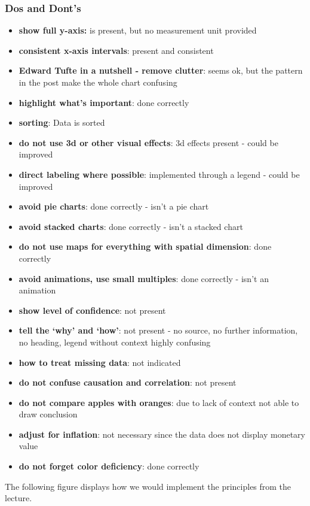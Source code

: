 \documentclass[a4paper]{article}
\begin{document}
    \subsubsection{Dos and Dont's}
    \begin{itemize}
        \item \textbf{show full y-axis:} is present, but no measurement unit provided
        \item \textbf{consistent x-axis intervals}: present and consistent
        \item \textbf{Edward Tufte in a nutshell - remove clutter}: seems ok, but the pattern in the post make the
        whole chart confusing
        \item \textbf{highlight what’s important}: done correctly
        \item \textbf{sorting}: Data is sorted
        \item \textbf{do not use 3d or other visual effects}: 3d effects present - could be improved
        \item \textbf{direct labeling where possible}: implemented through a legend - could be improved
        \item \textbf{avoid pie charts}: done correctly - isn't a pie chart
        \item \textbf{avoid stacked charts}: done correctly - isn't a stacked chart
        \item \textbf{do not use maps for everything with spatial dimension}: done correctly
        \item \textbf{avoid animations, use small multiples}: done correctly - isn't an animation
        \item \textbf{show level of confidence}: not present
        \item \textbf{tell the ‘why’ and ‘how’}: not present - no source, no further information, no heading,
        legend without context highly confusing
        \item \textbf{how to treat missing data}: not indicated
        \item \textbf{do not confuse causation and correlation}: not present
        \item \textbf{do not compare apples with oranges}: due to lack of context not able to draw conclusion
        \item \textbf{adjust for inflation}: not necessary since the data does not display monetary value
        \item \textbf{do not forget color deficiency}: done correctly
    \end{itemize}

    The following figure displays how we would implement the principles from the lecture.
    
\end{document}
